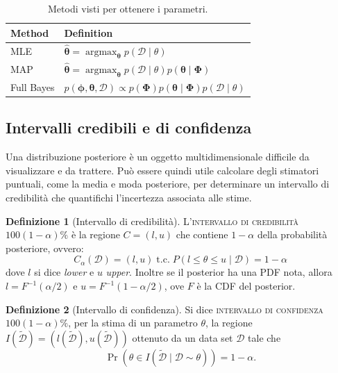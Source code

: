 \documentclass[10pt]{article}
\DeclareMathOperator{\pr}{Pr}
\DeclareMathOperator*{\argmax}{argmax}
\newcommand{\ve}[1]{\bm{#1}}
\newcommand{\im}[1]{\textsc{#1}}
\newcommand{\cond}{\mid}
\newcommand{\tc}{\ensuremath{\;\text{t.c.}\;}}
\theoremstyle{definition}
\newtheorem{definition}{Definizione}[section]
\begin{document}
    \begin{table}[]
        \centering\begin{tabular}{ll}
            \toprule
            Method & Definition \\
            \midrule
            MLE & \( \hat{\ve{\theta}} = \argmax_{\ve{\theta}} p \left( \mathcal{D}\cond \theta \right) \) \\
            MAP & \( \hat{\ve{\theta}} = \argmax_{\ve{\theta}} p \left( \mathcal{D}\cond \theta \right) p \left( \ve{\theta} \cond \ve{\Phi} \right)\) \\
            Full Bayes & \( p \left( \ve{\phi}, \ve{\theta}, \mathcal{D} \right) \propto p \left( \ve{\Phi} \right) p \left( \ve{\theta} \cond \ve{\Phi}\right) p \left( \mathcal{D} \cond \theta \right) \) \\
            \bottomrule
        \end{tabular}
        \caption{Metodi visti per ottenere i parametri.}\label{tab:metodi-parametri}
    \end{table}

\subsection{Intervalli credibili e di confidenza}
    Una distribuzione posteriore è un oggetto multidimensionale difficile da
    visualizzare e da trattere. Può essere quindi utile calcolare degli
    stimatori puntuali, come la media e moda posteriore, per determinare un
    intervallo di credibilità che quantifichi l'incertezza associata alle stime.

    \begin{definition}[Intervallo di credibilità]
        L'\im{intervallo di credibilità} \( 100\left( 1 - \alpha \right)\% \) è la regione \(C = \left( l, u \right)\)
        che contiene \( 1 - \alpha \) della probabilità posteriore, ovvero:
        \begin{equation}
            C_\alpha \left( \mathcal{D} \right) = \left( l, u \right) \tc P\left( l \leq \theta \leq u \cond \mathcal{D} \right) = 1 - \alpha
        \end{equation}
        dove \(l\) si dice \textit{lower} e \(u\) \textit{upper}. Inoltre se il posterior
        ha una PDF nota, allora \(l = F^{-1} \left( \alpha/2 \right) \) e \( u = F^{-1} \left( 1 - \alpha/2 \right)\),
        ove \(F\) è la CDF del posterior.
    \end{definition}

    \begin{definition}[Intervallo di confidenza]
        Si dice \im{intervallo di confidenza} \(100 \left( 1 - \alpha \right)\% \), per la stima di un
        parametro \( \theta \), la regione \(I ( \tilde{\mathcal{D}} ) = ( l( \mathcal{\tilde{D}} ), u( \mathcal{\tilde{D}} ) )\)
        ottenuto da un data set \(\mathcal{D}\) tale che
        \begin{equation}
            \pr \left( \theta \in I \left( \mathcal{\tilde{D}} \cond \mathcal{D} \sim \theta \right) \right) = 1 - \alpha.
        \end{equation}

    \end{definition}
\end{document}
